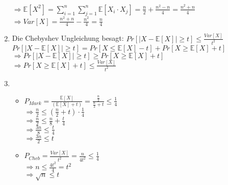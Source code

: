 \documentclass[8pt]{extreport}
\begin{document}
\begin{enumerate}[label = (\alph*)]
\begin{itemize}
\end{itemize}
$\Rightarrow \mathbb{E}[X^2] = \displaystyle\sum_{i=1}^{n} \displaystyle\sum_{j=1}^{n} \mathbb{E}[X_i \cdot X_j] = \frac{n}{2} + \frac{n^2 -n}{4} = \frac{n^2 + n}{4}$\\
$\Rightarrow Var[X] = \frac{n^2 + n }{4} - \frac{n^2}{4} = \frac{n}{4}$
\item Die Chebyshev Ungleichung besagt: $Pr[|X - \mathbb{E}[X]| \geq t] \leq \frac{Var[X]}{t^2}$\\
$Pr[|X - \mathbb{E}[X]| \geq t]  = Pr[X \leq \mathbb{E}[X] -t] + Pr[X \geq \mathbb{E}[X] + t]$\\
$\Rightarrow Pr[|X - \mathbb{E}[X]| \geq t] \geq Pr[X \geq \mathbb{E}[X] + t]$\\
$\Rightarrow  Pr[X \geq \mathbb{E}[X] + t] \leq \frac{Var[X]}{t^2}$\\
\item
\begin{itemize}
\item $P_{Mark} = \frac{\mathbb{E}[X]}{(\mathbb{E}[X] + t)} = \frac{\frac{n}{2}}{\frac{n}{2} +t} \leq \frac{1}{4}$\\
$\Rightarrow \frac{n}{2}  \leq (\frac{n}{2} + t) \cdot \frac{1}{4}$\\
$\Rightarrow \frac{n}{2} \leq \frac{n}{8} + \frac{t}{4}$\\
$\Rightarrow \frac{3n}{8} \leq \frac{t}{4}$\\
$\Rightarrow \frac{3n}{2} \leq t$\\
\item $P_{Cheb} = \frac{Var[X]}{t^2}  = \frac{n}{4t^2} \leq \frac{1}{4}$\\
$\Rightarrow n \leq \frac{4t^2}{4} = t^2$\\
$\Rightarrow \sqrt{n} \leq t$
\end{itemize}
\end{enumerate}
\end{document}
